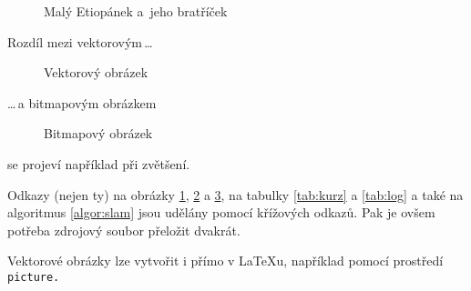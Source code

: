 \documentclass[a4paper, 11pt]{article}
\begin{document}
\begin{figure}[h]
\centering
{}
\caption{Malý Etiopánek a~jeho bratříček}
\label{fig:etiop}
\end{figure}

\bigskip
\pagebreak

Rozdíl mezi vektorovým\,\dots
\begin{figure}[h]
\centering
{}

\caption{Vektorový obrázek}
\label{fig:oniisan}
\end{figure}
\bigskip

\noindent
\dots\,a bitmapovým obrázkem
\begin{figure}[h]
\centering
{}
\caption{Bitmapový obrázek}
\label{fig:oniisan2}
\end{figure}
\bigskip

\noindent
se projeví například při zvětšení.

Odkazy (nejen ty) na obrázky \ref{fig:etiop}, \ref{fig:oniisan} a \ref{fig:oniisan2}, na tabulky \ref{tab:kurz} a \ref{tab:log} a také na algoritmus \ref{algor:slam} jsou udělány pomocí křížových odkazů. Pak je ovšem potřeba zdrojový soubor přeložit dvakrát.

Vektorové obrázky lze vytvořit i přímo v \LaTeX u, například pomocí prostředí\texttt{ picture.}

\pagebreak
\bigskip
\end{document}
